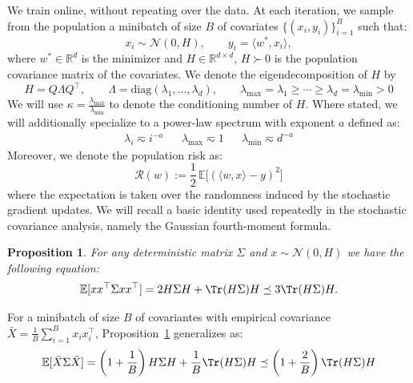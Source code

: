 \documentclass{article}
\newcommand{\E}{\mathbb{E}}
\def\N{\mathcal{N}}
\newtheorem{proposition}{Proposition}
\newcommand{\diag}{\text{diag}}
\begin{document}
We train online, without repeating over the data. At each iteration, we sample from the population a minibatch of size $B$ of covariates $\{(x_i, y_i)\}_{i=1}^B$ such that:
\[
x_i \sim \mathcal N(0,H),
\qquad
y_i = \langle w^*, x_i\rangle,
\]
where \(w^* \in \mathbb R^d\) is the minimizer and $H \in \mathbb R^{d\times d}$, $H \succ 0$ is the population covariance matrix of the covariates. We denote the eigendecomposition of \(H\) by
\[
H = Q \Lambda Q^\top,
\qquad
\Lambda = \diag(\lambda_1,\dots,\lambda_d),
\qquad
\lambda_{\max}=\lambda_1 \ge \cdots \ge \lambda_d = \lambda_{\min} > 0
\]
We will use $\kappa = \frac{\lambda_{\max}}{\lambda_{\min}}$ to denote the conditioning number of $H$. Where stated, we will additionally specialize to a power-law spectrum  with exponent $a$ defined as:
\begin{align*}
    \lambda_i \eqsim i^{-a} &&
\lambda_{\max} \eqsim 1&&
\lambda_{\min} \eqsim d^{-a}
\end{align*}
Moreover, we denote the population risk as:
\[
\mathcal R(w)
:= \frac12 \, \E\big[(\langle w,x\rangle - y)^2\big]
\]
where the expectation is taken over the randomness induced by the stochastic gradient updates. We will recall a basic identity used repeatedly in the stochastic covariance analysis, namely the Gaussian fourth-moment formula. 
\begin{proposition}
    \label{prop:gaussian_forth}
    For any deterministic matrix $\Sigma$ and $x \sim \N(0, H)$ we have the following equation:
    \begin{equation}
    \E[xx^\top \Sigma xx^\top]
    =
    2H \Sigma H
    +
    \Tr(H \Sigma) H \preceq 3 \Tr(H \Sigma) H.
    \end{equation}
\end{proposition}
For a minibatch of size $B$ of covariantes with empirical covariance $\bar{X} = \frac1B \sum_{i=1}^B x_i x_i^\top$, Proposition~\ref{prop:gaussian_forth} generalizes as:
\begin{equation}
\label{eq:gaussian-fourth-b}
\E[\bar{X} \Sigma \bar{X}]
=
\left(1 + \frac1B \right)H \Sigma H
+
\frac1B \Tr(H \Sigma) H \preceq \left(1 + \frac2B\right) \Tr(H \Sigma) H
\end{equation}
\end{document}
